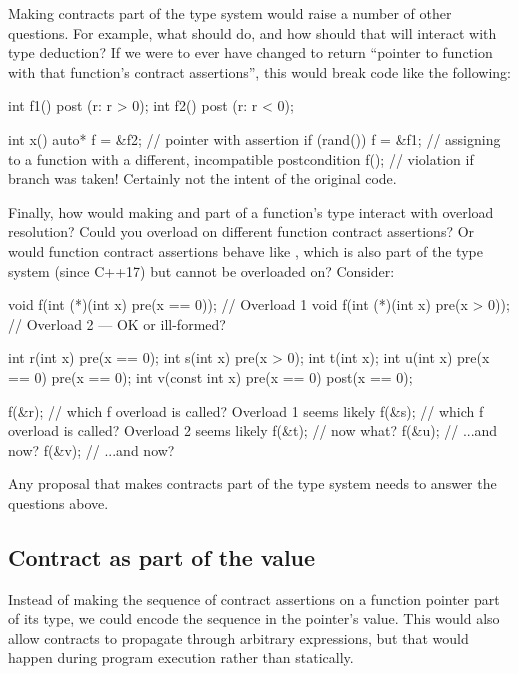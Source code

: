 Making contracts part of the type system would raise a number of other questions. For example, what should  do, and how should that will interact with type deduction? If we were to ever have  changed to return ``pointer to function with that function's contract assertions'', this would break code like the following:
\begin{codeblock}
int f1() post (r: r > 0);
int f2() post (r: r < 0);

int x() {
  auto* f = &f2;   // pointer with assertion 
  if (rand()) {
    f = &f1;  // assigning to a function with a different, incompatible postcondition
  }
  f();  // violation if branch was taken! Certainly not the intent of the original code.
}
\end{codeblock}
Finally, how would making  and  part of a function's type interact with overload resolution? Could you overload on different function contract assertions? Or would function contract assertions behave like , which is also part of the type system (since C++17) but cannot be overloaded on? Consider:
\begin{codeblock}
void f(int (*)(int x) pre(x == 0));  // Overload 1
void f(int (*)(int x) pre(x > 0));   // Overload 2 --- OK or ill-formed?

int r(int x) pre(x == 0);
int s(int x) pre(x > 0);
int t(int x);
int u(int x) pre(x == 0) pre(x == 0);
int v(const int x) pre(x == 0) post(x == 0);

f(&r);  // which f overload is called? Overload 1 seems likely
f(&s);  // which f overload is called? Overload 2 seems likely
f(&t);  // now what?
f(&u);  // ...and now?
f(&v);  // ...and now?
\end{codeblock}
Any proposal that makes contracts part of the type system needs to answer the questions above.


\subsection{Contract as part of the value}
\label{value}

Instead of making the sequence of contract assertions on a function pointer part of its type, we could encode the sequence in the pointer's value. This would also allow contracts to propagate through arbitrary expressions, but that would happen during program execution rather than statically.

